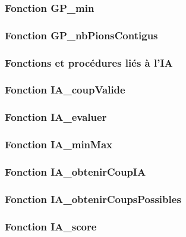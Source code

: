 \documentclass{report}
\begin{document}
             \subsubsection{Fonction GP\_min}
                      \bigskip
             \subsubsection{Fonction GP\_nbPionsContigus}
                  \bigskip                
             
             
               \subsubsection{Fonctions et procédures liés à l'IA}
               
               \subsubsection{Fonction IA\_coupValide}
                 \bigskip        
               
               \subsubsection{Fonction IA\_evaluer}
                   \bigskip  

                \subsubsection{Fonction IA\_minMax}
                    \bigskip  
               
     \subsubsection{Fonction IA\_obtenirCoupIA}
        \bigskip  
      
     \subsubsection{Fonction IA\_obtenirCoupsPossibles}
       \bigskip  

     \subsubsection{Fonction IA\_score}
        \bigskip  
    
\end{document}
